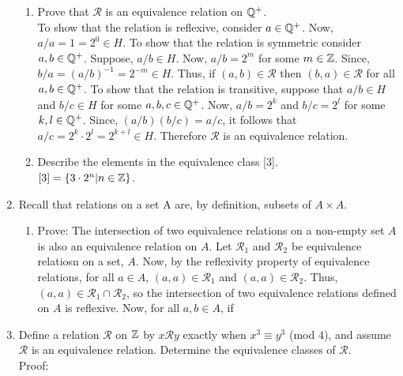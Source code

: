 \documentclass[12pt]{article}
\newcommand{\mc}[1]{\mathcal{#1}}
\begin{document}
\begin{enumerate}
\begin{enumerate}
            \item Prove that \(\mc R\) is an equivalence relation on \(\mathbb{Q}^+\). \\
            To show that the relation is reflexive, consider \(a\in \mathbb{Q}^+\). Now, \(a/a = 1 = 2^0 \in H\). To show that the relation is symmetric consider \(a, b \in \mathbb{Q}^+\). Suppose, \(a/b\in H\). Now, \(a/b = 2^m\) for some \(m \in \mathbb{Z}\). Since, \(b/a = (a/b)^{-1} = 2^{-m} \in H\). Thus, if \((a,b)\in \mc R\) then \((b,a)\in \mc R\) for all \(a,b \in \mathbb{Q}^+\). To show that the relation is transitive, suppose that \(a/b \in H\) and \(b/c\in H\) for some \(a, b, c\in \mathbb{Q}^+\). Now, \(a/b = 2^k\) and \(b/c = 2^l\) for some \(k, l \in \mathbb{Q}^+\). Since, \((a/b)(b/c) = a/c\), it follows that \(a/c = 2^k\cdot2^l = 2^{k+l}\in H\). Therefore \(\mc R\) is an equivalence relation. 
            \item Describe the elements in the equivalence class [3]. \\ \(\mc [3] = \{3\cdot2^n|n\in \Z\}\). 
        \end{enumerate}
        \item Recall that relations on a set A are, by definition, subsets of \(A\times A\). \begin{enumerate}
            \item {\sc Prove:} The intersection of two equivalence relations on a non-empty set \(A\) is also an equivalence relation on \(A\). Let \(\mc{R}_1\) and \(\mc{R}_2\) be equivalence relatiosn on a set, \(A\). Now, by the reflexivity property of equivalence relations, for all \(a\in A\), \((a, a) \in \mc R_1\) and \((a, a) \in \mc R_2\). Thus, \((a, a)\in \mc R_1\cap \mc R_2\), so the intersection of two equivalence relations defined on \(A\) is reflexive. Now, for all \(a,b\in A\), if 
        \end{enumerate}
        \item Define a relation \(\mc R\) on \(\mathbb{Z}\) by \(x\mc Ry\) exactly when \(x^3 \equiv y^3 \) (mod 4), and assume \(\mc R\) is an equivalence relation. Determine the equivalence classes of \(\mc R\). \\ {\sc Proof:} 
    \end{enumerate}
\end{document}
